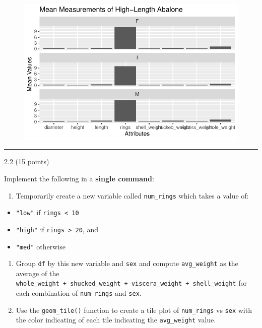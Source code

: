 \documentclass[
  letterpaper,
  DIV=11,
  numbers=noendperiod]{scrartcl}
\providecommand{\tightlist}{%
  \setlength{\itemsep}{0pt}\setlength{\parskip}{0pt}}\usepackage{longtable,booktabs,array}
\begin{document}
\begin{figure}[H]

{\centering \includegraphics{hw2_files/figure-pdf/unnamed-chunk-9-1.pdf}

}

\end{figure}

\begin{center}\rule{0.5\linewidth}{0.5pt}\end{center}

2.2 (15 points)

Implement the following in a \textbf{single command}:

\begin{enumerate}
\def\labelenumi{\arabic{enumi}.}
\tightlist
\item
  Temporarily create a new variable called \texttt{num\_rings} which
  takes a value of:
\end{enumerate}

\begin{itemize}
\tightlist
\item
  \texttt{"low"} if \texttt{rings\ \textless{}\ 10}
\item
  \texttt{"high"} if \texttt{rings\ \textgreater{}\ 20}, and
\item
  \texttt{"med"} otherwise
\end{itemize}

\begin{enumerate}
\def\labelenumi{\arabic{enumi}.}
\setcounter{enumi}{1}
\item
  Group \texttt{df} by this new variable and \texttt{sex} and compute
  \texttt{avg\_weight} as the average of the
  \texttt{whole\_weight\ +\ shucked\_weight\ +\ viscera\_weight\ +\ shell\_weight}
  for each combination of \texttt{num\_rings} and \texttt{sex}.
\item
  Use the \texttt{geom\_tile()} function to create a tile plot of
  \texttt{num\_rings} vs \texttt{sex} with the color indicating of each
  tile indicating the \texttt{avg\_weight} value.
\end{enumerate}
\end{document}
